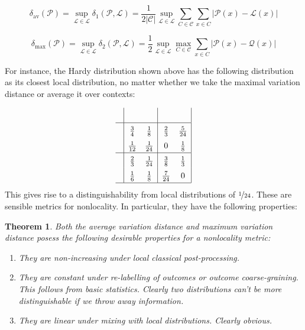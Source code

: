 \documentclass{amsart}
\newtheorem{thm}{Theorem}
\theoremstyle{definition}
\begin{document}
\begin{equation}
\delta_{\mbox{av}}(\mathcal{P})=\sup_{\mathcal{L}\in\mathscr{L}}\delta_1(\mathcal{P},\mathcal{L})=\frac{1}{2\left|\mathcal{C}\right|}\sup_{\mathcal{L}\in\mathscr{L}}\sum_{C\in\mathcal{C}}\sum_{x\in C}\left|\mathcal{P}(x)-\mathcal{L}(x)\right|
\end{equation}

\begin{equation}
\delta_{\mbox{max}}(\mathcal{P})=\sup_{\mathcal{L}\in\mathscr{L}}\delta_2(\mathcal{P},\mathcal{L})=\frac{1}{2}\sup_{\mathcal{L}\in\mathscr{L}}\max_{C\in\mathcal{C}}\sum_{x\in C}\left|\mathcal{P}(x)-\mathcal{Q}(x)\right|
\end{equation}

For instance, the Hardy distribution shown above has the following distribution as its closest local distribution, no matter whether we take the maximal variation distance or average it over contexts:

\begin{equation}\renewcommand{\arraystretch}{1.5}
\begin{array}{c| c c | c c |} 
&&&&\\\hline
&\frac{3}{4} &\frac{1}{8}  &\frac{2}{3} & \frac{5}{24}\\
&\frac{1}{12} &\frac{1}{24}  &0 &\frac{1}{8}\\ \hline
&\frac{2}{3}&\frac{1}{24}&\frac{3}{8} &\frac{1}{3} \\
&\frac{1}{6}&\frac{1}{8} &\frac{7}{24} &0 \\ \hline
\end{array} \renewcommand{\arraystretch}{1}
\end{equation}
This gives rise to a distinguishability from local distributions of $\nicefrac{1}{24}$.
These are sensible metrics for nonlocality. In particular, they have the following properties:

\begin{thm}
Both the average variation distance and maximum variation distance posess the following desirable properties for a nonlocality metric:
\begin{enumerate} 
\item They are non-increasing under local classical post-processing.
\item They are constant under re-labelling of outcomes or outcome coarse-graining. This follows from basic statistics. Clearly two distributions can't be more distinguishable if we throw away information.
\item They are linear under mixing with local distributions. Clearly obvious.
\end{enumerate}
\end{thm}
\end{document}
